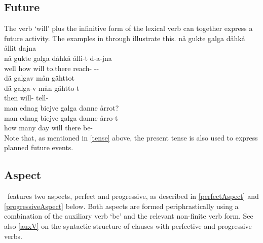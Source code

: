 \subsection{Future}\label{futureTense}
The verb  ‘will’ plus the infinitive form of the lexical verb can together express a future activity. The examples in  through  illustrate this.
\ea\label{futureTenseEx1}%
\glll	nå gukte galga dåhkå ållit dajna\\
	nå gukte galga dåhkå ålli-t d-a-jna\\
	well how will\BS{} to.there reach- --\\\nopagebreak
{}	
\z
\ea\label{futureTenseEx2}%
\glll	dä galgav mån gähttot\\
	dä galga-v mån gähtto-t\\
	then will-  tell-\\\nopagebreak
{}	
\z
\ea\label{futureTenseEx3}%
\glll	man ednag biejve galga danne årrot?\\
	man ednag biejve galga danne årro-t\\
	how many day\BS{} will\BS{} there be-\\\nopagebreak
{}	
\z
Note that, as mentioned in \SEC\ref{tense} above, the present tense is also used to express planned future events. 

\subsection{Aspect}\label{aspect}
\PS\ features two aspects, perfect and progressive, as described in \SEC\ref{perfectAspect} and \SEC\ref{progressiveAspect} below. Both aspects are formed periphrastically using a combination of the auxiliary verb  ‘be’ and the relevant non-finite verb form. 
See also \SEC\ref{auxV} on the syntactic structure of clauses with perfective and progressive verbs. 

